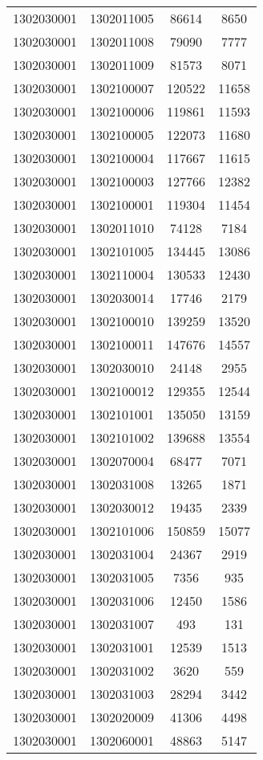 \begin{longtable}[h]{llcc}
		1302030001 & 1302011005 & 86614 & 8650\\
		1302030001 & 1302011008 & 79090 & 7777\\
		1302030001 & 1302011009 & 81573 & 8071\\
		1302030001 & 1302100007 & 120522 & 11658\\
		1302030001 & 1302100006 & 119861 & 11593\\
		1302030001 & 1302100005 & 122073 & 11680\\
		1302030001 & 1302100004 & 117667 & 11615\\
		1302030001 & 1302100003 & 127766 & 12382\\
		1302030001 & 1302100001 & 119304 & 11454\\
		1302030001 & 1302011010 & 74128 & 7184\\
		1302030001 & 1302101005 & 134445 & 13086\\
		1302030001 & 1302110004 & 130533 & 12430\\
		1302030001 & 1302030014 & 17746 & 2179\\
		1302030001 & 1302100010 & 139259 & 13520\\
		1302030001 & 1302100011 & 147676 & 14557\\
		1302030001 & 1302030010 & 24148 & 2955\\
		1302030001 & 1302100012 & 129355 & 12544\\
		1302030001 & 1302101001 & 135050 & 13159\\
		1302030001 & 1302101002 & 139688 & 13554\\
		1302030001 & 1302070004 & 68477 & 7071\\
		1302030001 & 1302031008 & 13265 & 1871\\
		1302030001 & 1302030012 & 19435 & 2339\\
		1302030001 & 1302101006 & 150859 & 15077\\
		1302030001 & 1302031004 & 24367 & 2919\\
		1302030001 & 1302031005 & 7356 & 935\\
		1302030001 & 1302031006 & 12450 & 1586\\
		1302030001 & 1302031007 & 493 & 131\\
		1302030001 & 1302031001 & 12539 & 1513\\
		1302030001 & 1302031002 & 3620 & 559\\
		1302030001 & 1302031003 & 28294 & 3442\\
		1302030001 & 1302020009 & 41306 & 4498\\
		1302030001 & 1302060001 & 48863 & 5147\\

\end{longtable}
